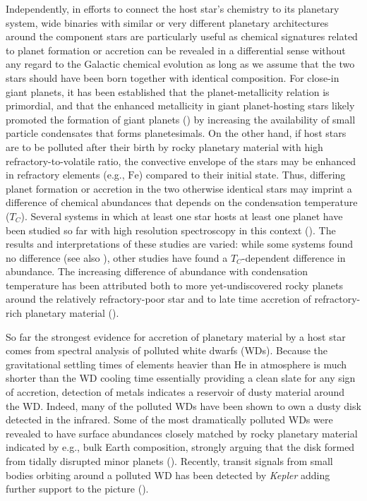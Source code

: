 \documentclass[manuscript]{aastex6}
\newcommand{\project}[1]{\textsl{#1}}
\newcommand*\elem[1]{\ensuremath{\mathrm{#1}}}
\newcommand{\Tcondens}{\ensuremath{T_C}}
\begin{document}
Independently, in efforts to connect the host star's chemistry to
its planetary system, wide binaries with similar or very different planetary architectures around
the component stars are particularly useful as chemical signatures related to planet formation or accretion
can be revealed in a differential sense without any regard to the Galactic chemical evolution
as long as we assume that the two stars should have been born together with identical composition.
For close-in giant planets, it has been established that the planet-metallicity relation
is primordial, and that the enhanced metallicity in giant planet-hosting stars likely
promoted the formation of giant planets (\citealt{Fischer:2005aa}) by increasing
the availability of small particle condensates that forms planetesimals.
On the other hand, if host stars are to be polluted after their birth
by rocky planetary material with high refractory-to-volatile ratio,
the convective envelope of the stars may be enhanced in refractory elements (e.g., \elem{Fe})
compared to their initial state.
Thus, differing planet formation or accretion in the two otherwise identical stars
may imprint a difference of chemical abundances that depends on the
condensation temperature (\Tcondens).
Several systems in which at least one star hosts at least one planet
have been studied so far with high resolution spectroscopy in this context
(\citealt{Teske:2013aa,Mack:2014aa,Liu:2014aa,Teske:2015aa,Saffe:2015aa,
  Ramirez:2015aa,Biazzo:2015aa,Mack:2016aa,Teske:2016aa,Teske:2016ab}).
The results and interpretations of these studies are varied: while some systems
found no difference (see also \citealt{Desidera:2004aa,Gratton:2001aa}), other
studies  have found a \Tcondens-dependent difference in abundance.
The increasing difference of abundance with condensation temperature
has been attributed both to more yet-undiscovered rocky planets around
the relatively refractory-poor star and to late time accretion of
refractory-rich planetary material (\citealt{Ramirez:2015aa,Biazzo:2015aa}).

So far the strongest evidence for accretion of planetary material by a host star comes
from spectral analysis of polluted white dwarfs (WDs).
Because the gravitational settling times of elements heavier than \elem{He} in
atmosphere is much shorter than the WD cooling time essentially providing a
clean slate for any sign of accretion, detection of metals indicates a
reservoir of dusty material around the WD.
Indeed, many of the polluted WDs have been shown to own a dusty disk detected
in the infrared.
Some of the most dramatically polluted WDs were revealed to have
surface abundances closely matched by rocky planetary material
indicated by e.g., bulk Earth composition, strongly arguing
that the disk formed from tidally disrupted minor planets
(\citealt{Zuckerman:2007aa,Klein:2010aa}).
Recently, transit signals from small bodies orbiting around a polluted WD
has been detected by \project{Kepler} adding further support to the picture
(\citealt{2015Natur.526..546V}).
\end{document}
